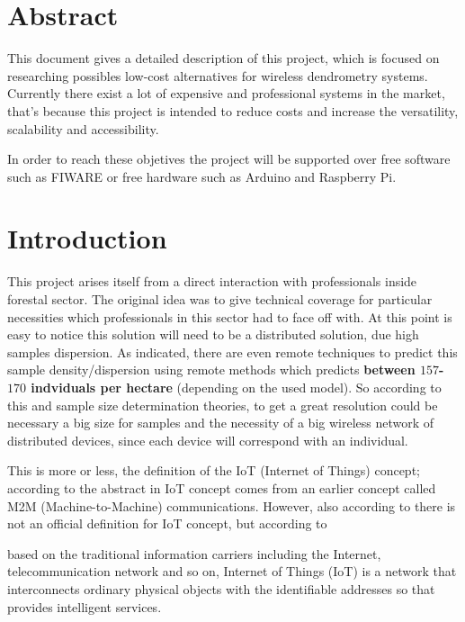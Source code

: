 \documentclass[11pt,a4paper,dvipsnames,twoside]{article}
\newcommand{\doubt}[1] {\textbf{\color{Red3}#1}}
\begin{document}
\newpage

\section*{Abstract}
%
This document gives a detailed description of this project, which is focused on researching possibles low-cost alternatives for wireless dendrometry systems. Currently there exist a lot of expensive and professional systems in the market, that's because this project is intended to reduce costs and increase the versatility, scalability and accessibility.

In order to reach these objetives the project will be supported over free software such as FIWARE\cite{Fiware} or free hardware such as Arduino\cite{Arduino} and Raspberry Pi\cite{Raspberrypi}.

\section{Introduction}
This project arises itself from a direct interaction with professionals inside forestal sector. The original idea was to give technical coverage for particular necessities which professionals in this sector had to face off with. At this point is easy to notice this solution will need to be a distributed solution, due high samples dispersion. As indicated, there are even remote techniques to predict this sample density/dispersion using remote methods which predicts \doubt{between $157$-$170$ indviduals per hectare}\cite{ForestStandVol} (depending on the used model). So according to this and sample size determination theories, to get a great resolution could be necessary a big size for samples and the necessity of a big wireless network of distributed devices, since each device will correspond with an individual.

This is more or less, the definition of the IoT (Internet of Things) concept; according to the abstract in \cite{IoTOverview} IoT concept comes from an earlier concept called M2M (Machine-to-Machine) communications. However, also according to \cite[p.~1(71)]{IoTOverview} there is not an official definition for IoT concept, but according to \cite[p.~2(920)]{IoTObjetives}

\begin{quoting}
  based on the traditional information carriers including the Internet, telecommunication  network  and  so  on,  Internet  of Things (IoT) is a network that interconnects ordinary physical  objects  with  the identifiable addresses  so that provides intelligent services.
\end{quoting}
\end{document}
